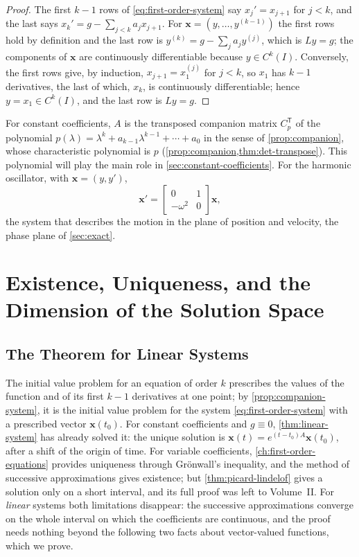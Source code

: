 \begin{proof}
The first $k-1$ rows of \eqref{eq:first-order-system} say $x_j'=x_{j+1}$ for $j<k$, and the last says $x_k'=g-\sum_{j<k}a_jx_{j+1}$. For $\mathbf x=(y,\ldots,y^{(k-1)})$ the first rows hold by definition and the last row is $y^{(k)}=g-\sum_ja_jy^{(j)}$, which is $Ly=g$; the components of $\mathbf x$ are continuously differentiable because $y\in C^k(I)$. Conversely, the first rows give, by induction, $x_{j+1}=x_1^{(j)}$ for $j<k$, so $x_1$ has $k-1$ derivatives, the last of which, $x_k$, is continuously differentiable; hence $y=x_1\in C^k(I)$, and the last row is $Ly=g$.
\end{proof}

For constant coefficients, $A$ is the transposed companion matrix $C_p^{\mathsf T}$ of the polynomial $p(\lambda)=\lambda^k+a_{k-1}\lambda^{k-1}+\cdots+a_0$ in the sense of \cref{prop:companion}, whose characteristic polynomial is $p$ (\cref{prop:companion,thm:det-transpose}). This polynomial will play the main role in \cref{sec:constant-coefficients}. For the harmonic oscillator, with $\mathbf x=(y,y')$,
\[
\mathbf x'=\begin{bmatrix}0&1\\-\omega^2&0\end{bmatrix}\mathbf x ,
\]
the system that describes the motion in the plane of position and velocity, the phase plane of \cref{sec:exact}.

\section{Existence, Uniqueness, and the Dimension of the Solution Space}
\label{sec:higher-existence}

\subsection{The Theorem for Linear Systems}

The initial value problem for an equation of order $k$ prescribes the values of the function and of its first $k-1$ derivatives at one point; by \cref{prop:companion-system}, it is the initial value problem for the system \eqref{eq:first-order-system} with a prescribed vector $\mathbf x(t_0)$. For constant coefficients and $g\equiv0$, \cref{thm:linear-system} has already solved it: the unique solution is $\mathbf x(t)=e^{(t-t_0)A}\mathbf x(t_0)$, after a shift of the origin of time. For variable coefficients, \cref{ch:first-order-equations} provides uniqueness through Gr\"onwall's inequality, and the method of successive approximations gives existence; but \cref{thm:picard-lindelof} gives a solution only on a short interval, and its full proof was left to Volume~II. For \emph{linear} systems both limitations disappear: the successive approximations converge on the whole interval on which the coefficients are continuous, and the proof needs nothing beyond the following two facts about vector-valued functions, which we prove.

